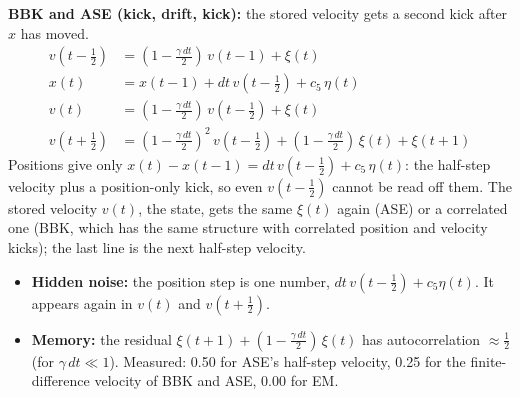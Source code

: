 \documentclass[10pt]{article}
\begin{document}
\textbf{BBK and ASE (kick, drift, kick):} the stored velocity gets a second kick after $x$ has moved.
\begin{align*}
v(t-\tfrac12) &= (1-\tfrac{\gamma\,dt}{2})\,v(t-1) + \xi(t)\\
x(t) &= x(t-1) + dt\,v(t-\tfrac12) + c_5\,\eta(t)\\
v(t) &= (1-\tfrac{\gamma\,dt}{2})\,v(t-\tfrac12) + \xi(t)\\
v(t+\tfrac12) &= (1-\tfrac{\gamma\,dt}{2})^2\,v(t-\tfrac12) + (1-\tfrac{\gamma\,dt}{2})\,\xi(t) + \xi(t+1)
\end{align*}
Positions give only $x(t)-x(t-1) = dt\,v(t-\tfrac12) + c_5\,\eta(t)$: the half-step velocity plus a position-only kick, so
even $v(t-\tfrac12)$ cannot be read off them. The stored velocity $v(t)$, the state, gets the same $\xi(t)$ again (ASE) or a
correlated one (BBK, which has the same structure with correlated position and velocity kicks); the last line is the next
half-step velocity.
\begin{itemize}
\item \textbf{Hidden noise:} the position step is one number, $dt\,v(t-\tfrac12)+c_5\eta(t)$. It appears again in $v(t)$ and $v(t+\tfrac12)$.
\item \textbf{Memory:} the residual $\xi(t+1)+(1-\tfrac{\gamma\,dt}{2})\,\xi(t)$ has autocorrelation $\approx\tfrac12$ (for $\gamma\,dt\ll1$). Measured: 0.50 for
  ASE's half-step velocity, 0.25 for the finite-difference velocity of BBK and ASE, 0.00 for EM.
  
\end{itemize}
\end{document}
